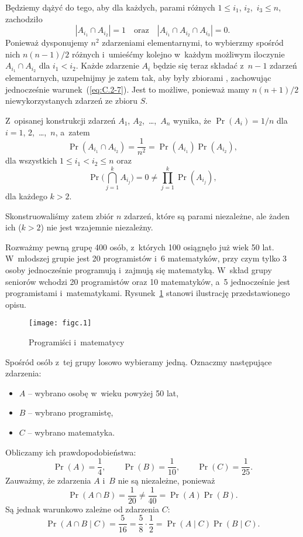 Będziemy dążyć do tego, aby dla każdych, parami różnych $1\le i_1$, $i_2$,~$i_3\le n$, zachodziło
\[
	|A_{i_1}\cap A_{i_2}| = 1 \quad\text{oraz}\quad |A_{i_1}\cap A_{i_2}\cap A_{i_3}| = 0. \tag{$*$}\label{eq:C.2-7}
\]
Ponieważ dysponujemy $n^2$ zdarzeniami elementarnymi, to wybierzmy spośród nich $n(n-1)/2$ różnych i~umieśćmy kolejno w~każdym możliwym iloczynie $A_{i_1}\cap A_{i_2}$ dla $i_1<i_2$. Każde zdarzenie $A_i$ będzie się teraz składać z~$n-1$ zdarzeń elementarnych, uzupełnijmy je zatem tak, aby były zbiorami , zachowując jednocześnie warunek~(\ref{eq:C.2-7}). Jest to możliwe, ponieważ mamy $n(n+1)/2$ niewykorzystanych zdarzeń ze zbioru $S$.

Z~opisanej konstrukcji zdarzeń $A_1$, $A_2$,~\dots,~$A_n$ wynika, że $\Pr(A_i)=1/n$ dla $i=1$, 2,~\dots,~$n$, a~zatem
\[
	\Pr(A_{i_1}\cap A_{i_2}) = \frac{1}{n^2} = \Pr(A_{i_1})\Pr(A_{i_2}),
\]
dla wszystkich $1\le i_1<i_2\le n$ oraz
\[
	\Pr\biggl(\bigcap_{j=1}^kA_{i_j}\biggr) = 0 \ne \prod_{j=1}^k\Pr(A_{i_j}),
\]
dla każdego $k>2$.

Skonstruowaliśmy zatem zbiór $n$ zdarzeń, które są parami niezależne, ale żaden ich  ($k>2$) nie jest wzajemnie niezależny.

\exercise{} %
Rozważmy pewną grupę 400 osób, z~których 100 osiągnęło już wiek 50 lat. W~młodszej grupie jest 20 programistów i~6 matematyków, przy czym tylko 3 osoby jednocześnie programują i~zajmują się matematyką. W~skład grupy seniorów wchodzi 20 programistów oraz 10 matematyków, a~5 jednocześnie jest programistami i~matematykami. Rysunek~\ref{fig:C.2-8} stanowi ilustrację przedstawionego opisu.
\begin{figure}[ht]
	\begin{center}
		\texttt{[image: figc.1]}
	\end{center}
	\caption{Programiści i~matematycy} \label{fig:C.2-8}
\end{figure}

Spośród osób z~tej grupy losowo wybieramy jedną. Oznaczmy następujące zdarzenia:
\begin{itemize}
	\item $A$ -- wybrano osobę w~wieku powyżej 50 lat,
	\item $B$ -- wybrano programistę,
	\item $C$ -- wybrano matematyka.
\end{itemize}
Obliczamy ich prawdopodobieństwa:
\[
	\Pr(A) = \frac{1}{4}, \qquad \Pr(B) = \frac{1}{10}, \qquad \Pr(C) = \frac{1}{25}.
\]
Zauważmy, że zdarzenia $A$ i~$B$ nie są niezależne, ponieważ
\[
	\Pr(A\cap B) = \frac{1}{20} \ne \frac{1}{40} = \Pr(A)\Pr(B).
\]
Są jednak warunkowo zależne od zdarzenia $C$:
\[
	\Pr(A\cap B\mid C) = \frac{5}{16} = \frac{5}{8}\cdot\frac{1}{2} = \Pr(A\mid C)\Pr(B\mid C).
\]


